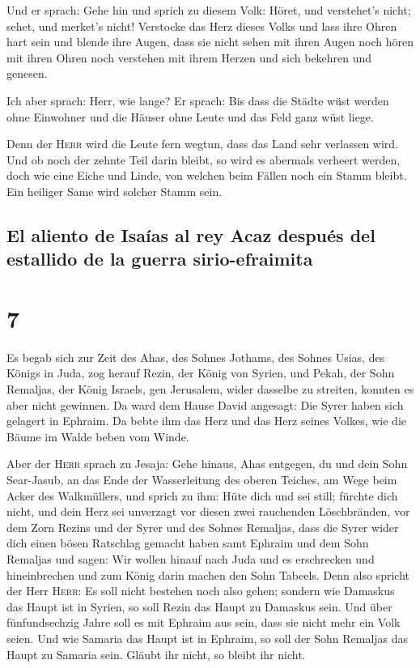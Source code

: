  Und er sprach: Gehe hin und sprich zu diesem Volk: Höret,
und verstehet's nicht; sehet, und merket's nicht! 
Verstocke das Herz dieses Volks und lass ihre Ohren hart sein und blende
ihre Augen, dass sie nicht sehen mit ihren Augen noch hören mit ihren
Ohren noch verstehen mit ihrem Herzen und sich bekehren und genesen.

 Ich aber sprach: Herr, wie lange? Er sprach: Bis dass
die Städte wüst werden ohne Einwohner und die Häuser ohne Leute und das
Feld ganz wüst liege.

 Denn der \textsc{Herr} wird die Leute fern wegtun, dass
das Land sehr verlassen wird.  Und ob noch der zehnte
Teil darin bleibt, so wird es abermals verheert werden, doch wie eine
Eiche und Linde, von welchen beim Fällen noch ein Stamm bleibt. Ein
heiliger Same wird solcher Stamm sein.

\hypertarget{el-aliento-de-isauxedas-al-rey-acaz-despuuxe9s-del-estallido-de-la-guerra-sirio-efraimita}{%
\subsection{El aliento de Isaías al rey Acaz después del estallido de la
guerra
sirio-efraimita}\label{el-aliento-de-isauxedas-al-rey-acaz-despuuxe9s-del-estallido-de-la-guerra-sirio-efraimita}}

\hypertarget{section-6}{%
\section{7}\label{section-6}}

 Es begab sich zur Zeit des Ahas, des Sohnes Jothams, des
Sohnes Usias, des Königs in Juda, zog herauf Rezin, der König von
Syrien, und Pekah, der Sohn Remaljas, der König Israels, gen Jerusalem,
wider dasselbe zu streiten, konnten es aber nicht gewinnen.
 Da ward dem Hause David angesagt: Die Syrer haben sich
gelagert in Ephraim. Da bebte ihm das Herz und das Herz seines Volkes,
wie die Bäume im Walde beben vom Winde.

 Aber der \textsc{Herr} sprach zu Jesaja: Gehe hinaus,
Ahas entgegen, du und dein Sohn Sear-Jasub, an das Ende der
Wasserleitung des oberen Teiches, am Wege beim Acker des Walkmüllers,
 und sprich zu ihm: Hüte dich und sei still; fürchte dich
nicht, und dein Herz sei unverzagt vor diesen zwei rauchenden
Löschbränden, vor dem Zorn Rezins und der Syrer und des Sohnes Remaljas,
 dass die Syrer wider dich einen bösen Ratschlag gemacht
haben samt Ephraim und dem Sohn Remaljas und sagen:  Wir
wollen hinauf nach Juda und es erschrecken und hineinbrechen und zum
König darin machen den Sohn Tabeels.  Denn also spricht
der Herr \textsc{Herr}: Es soll nicht bestehen noch also gehen;
 sondern wie Damaskus das Haupt ist in Syrien, so soll
Rezin das Haupt zu Damaskus sein. Und über fünfundsechzig Jahre soll es
mit Ephraim aus sein, dass sie nicht mehr ein Volk seien. 
Und wie Samaria das Haupt ist in Ephraim, so soll der Sohn Remaljas das
Haupt zu Samaria sein. Gläubt ihr nicht, so bleibt ihr nicht.

